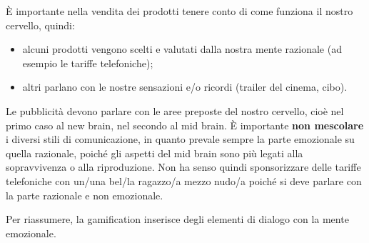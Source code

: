 È importante nella vendita dei prodotti tenere conto di come funziona il nostro
cervello, quindi:

\begin{itemize}
 \item alcuni prodotti vengono scelti e valutati dalla nostra mente razionale
 (ad esempio le tariffe telefoniche);
 \item altri parlano con le nostre sensazioni e/o ricordi (trailer del cinema,
 cibo).
\end{itemize}

Le pubblicità devono parlare con le aree preposte del nostro cervello, cioè nel 
primo caso al new brain, nel secondo al mid brain. È importante \textbf{non 
mescolare} i diversi stili di comunicazione, in quanto prevale sempre la parte 
emozionale su quella razionale, poiché gli aspetti del mid brain sono più 
legati alla sopravvivenza o alla riproduzione. Non ha senso quindi 
sponsorizzare delle tariffe telefoniche con un/una bel/la ragazzo/a mezzo 
nudo/a poiché si deve parlare con la parte razionale e non emozionale.

Per riassumere, la gamification inserisce degli elementi di dialogo
con la mente emozionale.
